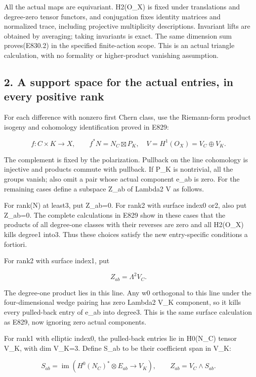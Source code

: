 All the actual maps are equivariant. H2(O\_X) is fixed under translations
and degree-zero tensor functors, and conjugation fixes identity matrices and
normalized trace, including projective multiplicity descriptions. Invariant
lifts are obtained by averaging; taking invariants is exact. The same
dimension sum proves(E830.2) in the specified finite-action scope. This is
an actual triangle calculation, with no formality or higher-product
vanishing assumption.

\subsection{2. A support space for the actual entries, in every positive
rank}\label{SF-E830:a-support-space-for-the-actual-entries-in-every-positive-rank}

For each difference with nonzero first Chern class, use the Riemann-form
product isogeny and cohomology identification proved in E829:

\[
 f:C\times K\to X,\qquad f^*N=N_C\boxtimes P_K,
 \quad V=H^1(O_X)=V_C\oplus V_K.
 \tag{E830.3}
\]

The complement is fixed by the polarization. Pullback on the line cohomology
is injective and products commute with pullback. If P\_K is nontrivial, all
the groups vanish; also omit a pair whose actual component e\_ab is zero.
For the remaining cases define a subspace Z\_ab of Lambda2 V as follows.

For rank(N) at least3, put Z\_ab=0. For rank2 with surface index0 or2, also
put Z\_ab=0. The complete calculations in E829 show in these cases that the
products of all degree-one classes with their reverses are zero and all
H2(O\_X) kills degree1 into3. Thus these choices satisfy the new
entry-specific conditions a fortiori.

For rank2 with surface index1, put

\[
 Z_{ab}=\Lambda^2V_C.
 \tag{E830.4}
\]

The degree-one product lies in this line. Any w0 orthogonal to this line
under the four-dimensional wedge pairing has zero Lambda2 V\_K component, so
it kills every pulled-back entry of e\_ab into degree3. This is the same
surface calculation as E829, now ignoring zero actual components.

For rank1 with elliptic index0, the pulled-back entries lie in H0(N\_C)
tensor V\_K, with dim V\_K=3. Define S\_ab to be their coefficient span in
V\_K:

\[
 S_{ab}=\operatorname{im}\left(
   H^0(N_C)^*\otimes E_{ab}\longrightarrow V_K\right),
 \qquad Z_{ab}=V_C\wedge S_{ab}.
 \tag{E830.5}
\]

